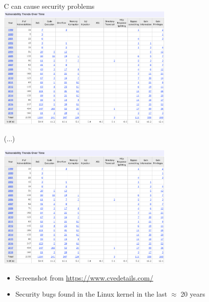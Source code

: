 \documentclass[NET,english,aspectratio=169,notitleframe,draft]{tumbeamer}
\begin{document}
\begin{frame}{C can cause security problems}
\centering\includegraphics[trim={0 13cm 0 0},clip,width=0.65\textwidth]{pics/cve}

\footnotesize (...)

\centering\includegraphics[trim={0 0 0 17.5cm},clip,width=0.65\textwidth]{pics/cve}

\begin{itemize}
\item Screenshot from \url{https://www.cvedetails.com/}
\item Security bugs found in the Linux kernel in the last $\approx$ 20 years
\end{itemize}

\end{frame}
\end{document}

